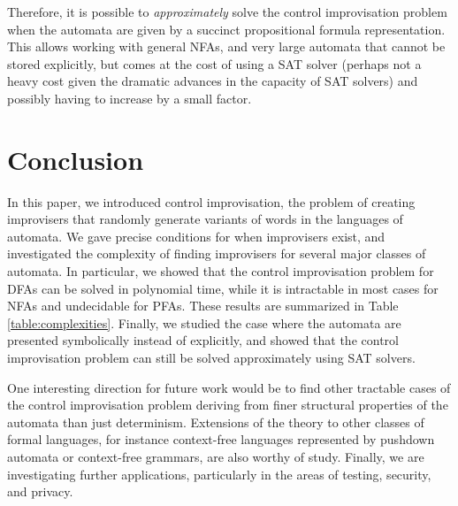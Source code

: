 \documentclass[a4paper,USenglish,numberwithinsect]{lipics}
\theoremstyle{plain}
\theoremstyle{definition}
\begin{document}
Therefore, it is possible to {\em approximately} solve the control
improvisation problem when the automata are given by a succinct
propositional formula representation. This allows working with general
NFAs, and very large automata that cannot be stored explicitly, but
comes at the cost of using a SAT solver (perhaps not a heavy cost
given the dramatic advances in the capacity of SAT solvers) and
possibly having to increase  by a small factor. 

\section{Conclusion} \label{section:conclusion}

In this paper, we introduced control improvisation, the problem of
creating improvisers that randomly generate variants of words in the
languages of automata. We gave precise conditions for when improvisers
exist, and investigated the complexity of finding improvisers for
several major classes of automata. In particular, we showed that the
control improvisation problem for DFAs can be solved in polynomial
time, while it is intractable in most cases for NFAs and undecidable 
for PFAs. These results are summarized in Table
\ref{table:complexities}. Finally, we studied the case where the
automata are presented symbolically instead of explicitly, and showed
that the control improvisation problem can still be solved
approximately using SAT solvers. 

One interesting direction for future
work would be to find other tractable cases of the control
improvisation problem deriving from finer structural properties of the
automata than just determinism. Extensions of the theory to other classes of
formal languages, for instance context-free languages represented by 
pushdown automata or context-free grammars, are also worthy of study. 
Finally, we are investigating
further applications, particularly in the areas of testing, security,
and privacy. 
\end{document}
